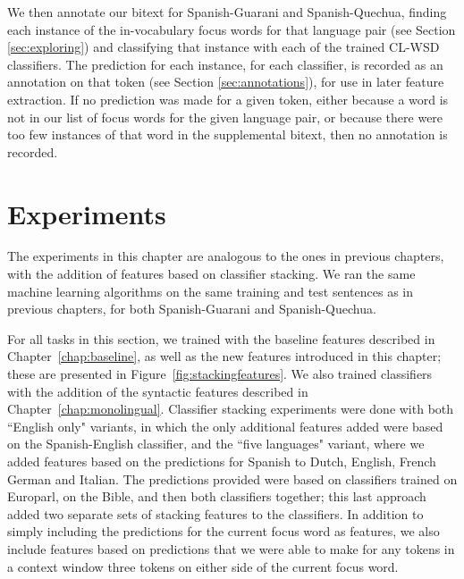 We then annotate our bitext for Spanish-Guarani and Spanish-Quechua, finding
each instance of the in-vocabulary focus words for that language pair (see
Section \ref{sec:exploring}) and classifying that instance with each of the
trained CL-WSD classifiers. The prediction for each instance, for each
classifier, is recorded as an annotation on that token (see Section
\ref{sec:annotations}), for use in later feature extraction. If no prediction
was made for a given token, either because a word is not in our list of focus
words for the given language pair, or because there were too few instances of
that word in the supplemental bitext, then no annotation is recorded.

\section{Experiments}
\label{sec:multilingual-experiments}

The experiments in this chapter are analogous to the ones in previous chapters,
with the addition of features based on classifier stacking. We ran the same
machine learning algorithms on the same training and test sentences as in
previous chapters, for both Spanish-Guarani and Spanish-Quechua.

For all tasks in this section, we trained with the baseline features described
in Chapter~\ref{chap:baseline}, as well as the new features introduced in this
chapter; these are presented in Figure~\ref{fig:stackingfeatures}.  We also
trained classifiers with the addition of the syntactic features described in
Chapter~\ref{chap:monolingual}. Classifier stacking experiments were done with
both ``English only" variants, in which the only additional features added were
based on the Spanish-English classifier, and the ``five languages" variant,
where we added features based on the predictions for Spanish to Dutch, English,
French German and Italian. The predictions provided were based on classifiers
trained on Europarl, on the Bible, and then both classifiers together; this
last approach added two separate sets of stacking features to the classifiers.
In addition to simply including the predictions for the current focus word as
features, we also include features based on predictions that we were able to
make for any tokens in a context window three tokens on either side of the
current focus word.

